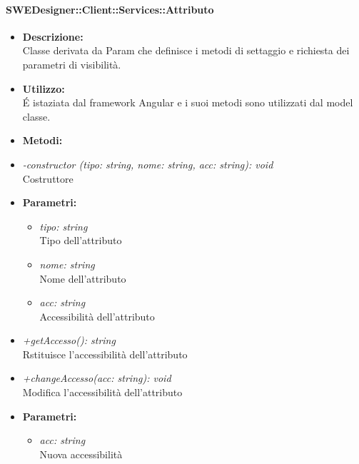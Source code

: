           	\paragraph{SWEDesigner::Client::Services::Attributo}
				\begin{itemize}
          			\item \textbf{Descrizione:}\\
          			Classe derivata da Param che definisce i metodi di settaggio e richiesta dei parametri di visibilità.
          			\item \textbf{Utilizzo:}\\
          			É istaziata dal framework Angular e i suoi metodi sono utilizzati dal model classe.
          			\item \textbf{Metodi:}\\
          				\item \emph{-constructor (tipo: string, nome: string, acc: string): void}\\
          				Costruttore
          				\item \textbf{Parametri:}\\
            				\begin{itemize}
            					\item \emph{tipo: string}\\
            					Tipo dell'attributo
            					\item \emph{nome: string}\\
            					Nome dell'attributo
            					\item \emph{acc: string}\\
            					Accessibilità dell'attributo
            				\end{itemize}
            			\item \emph{+getAccesso(): string}\\
          				Rstituisce l'accessibilità dell'attributo
          				\item \emph{+changeAccesso(acc: string): void}\\
          				Modifica l'accessibilità dell'attributo
          				\item \textbf{Parametri:}\\
            				\begin{itemize}
            					\item \emph{acc: string}\\
            					Nuova accessibilità
            				\end{itemize}
          		\end{itemize}
